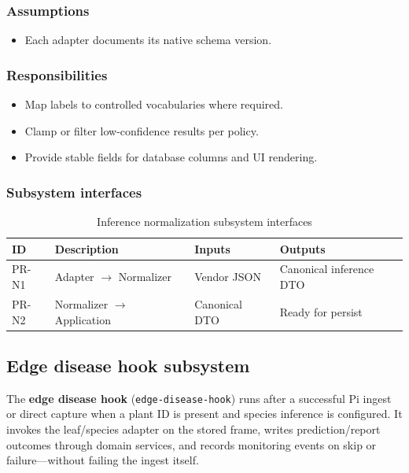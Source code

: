 \subsubsection{Assumptions}
\begin{itemize}
  \item Each adapter documents its native schema version.
\end{itemize}

\subsubsection{Responsibilities}
\begin{itemize}
  \item Map labels to controlled vocabularies where required.
  \item Clamp or filter low-confidence results per policy.
  \item Provide stable fields for database columns and UI rendering.
\end{itemize}

\subsubsection{Subsystem interfaces}
\begin{table}[H]
\centering
\small
\begin{tabular}{|p{0.9cm}|p{3.4cm}|p{3.0cm}|p{3.5cm}|}
\hline
\textbf{ID} & \textbf{Description} & \textbf{Inputs} & \textbf{Outputs} \\
\hline
PR-N1 & Adapter $\rightarrow$ Normalizer & Vendor JSON & Canonical inference DTO \\
\hline
PR-N2 & Normalizer $\rightarrow$ Application & Canonical DTO & Ready for persist \\
\hline
\end{tabular}
\caption{Inference normalization subsystem interfaces}
\end{table}

\subsection{Edge disease hook subsystem}

The \textbf{edge disease hook} (\texttt{edge-disease-hook}) runs after a successful Pi ingest or direct capture when a plant ID is present and species inference is configured. It invokes the leaf/species adapter on the stored frame, writes prediction/report outcomes through domain services, and records monitoring events on skip or failure---without failing the ingest itself.

